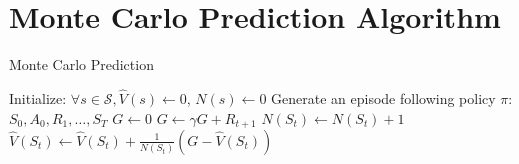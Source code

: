 \documentclass{article}
\begin{document}
\section*{Monte Carlo Prediction Algorithm}

\begin{algorithm}
\caption{Monte Carlo Prediction}
\begin{algorithmic}[1]
\STATE Initialize: $\forall s \in \mathcal{S}, \hat{V}(s) \leftarrow 0$, $N(s) \leftarrow 0$
    \STATE Generate an episode following policy $\pi$: $S_0, A_0, R_1, \ldots, S_T$
    \STATE $G \leftarrow 0$
        \STATE $G \leftarrow \gamma G + R_{t+1}$
            \STATE $N(S_t) \leftarrow N(S_t) + 1$
            \STATE $\hat{V}(S_t) \leftarrow \hat{V}(S_t) + \frac{1}{N(S_t)} (G - \hat{V}(S_t))$
        \ENDIF
    \ENDFOR
\ENDFOR
\end{algorithmic}
\end{algorithm}
\end{document}

